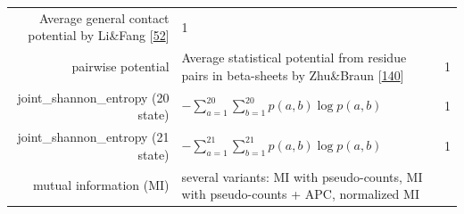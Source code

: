 \documentclass[12pt,a4paper,twoside]{book}
\theoremstyle{definition}
\theoremstyle{definition}
\theoremstyle{remark}
\begin{document}
\begin{longtable}[]{@{}rlc@{}}
\begin{minipage}[t]{0.50\columnwidth}
Average general contact potential by Li\&Fang
{[}\protect\hyperlink{ref-Li2011}{52}{]}\strut
\end{minipage} & \begin{minipage}[t]{0.18\columnwidth}\centering\strut
1\strut
\end{minipage}\tabularnewline
\begin{minipage}[t]{0.23\columnwidth}\raggedleft\strut
pairwise potential\strut
\end{minipage} & \begin{minipage}[t]{0.50\columnwidth}\raggedright\strut
Average statistical potential from residue pairs in beta-sheets by
Zhu\&Braun {[}\protect\hyperlink{ref-Zhu1999}{140}{]}\strut
\end{minipage} & \begin{minipage}[t]{0.18\columnwidth}\centering\strut
1\strut
\end{minipage}\tabularnewline
\begin{minipage}[t]{0.23\columnwidth}\raggedleft\strut
joint\_shannon\_entropy (20 state)\strut
\end{minipage} & \begin{minipage}[t]{0.50\columnwidth}\raggedright\strut
\(- \sum_{a=1}^{20}\sum_{b=1}^{20} p(a,b) \log p(a,b)\)\strut
\end{minipage} & \begin{minipage}[t]{0.18\columnwidth}\centering\strut
1\strut
\end{minipage}\tabularnewline
\begin{minipage}[t]{0.23\columnwidth}\raggedleft\strut
joint\_shannon\_entropy (21 state)\strut
\end{minipage} & \begin{minipage}[t]{0.50\columnwidth}\raggedright\strut
\(- \sum_{a=1}^{21}\sum_{b=1}^{21} p(a,b) \log p(a,b)\)\strut
\end{minipage} & \begin{minipage}[t]{0.18\columnwidth}\centering\strut
1\strut
\end{minipage}\tabularnewline
\begin{minipage}[t]{0.23\columnwidth}\raggedleft\strut
mutual information (MI)\strut
\end{minipage} & \begin{minipage}[t]{0.50\columnwidth}\raggedright\strut
several variants: MI with pseudo-counts, MI with pseudo-counts + APC,
normalized MI\strut
\end{minipage} & \begin{minipage}[t]{0.18\columnwidth}\centering\strut

\end{minipage}
\end{longtable}
\end{document}
